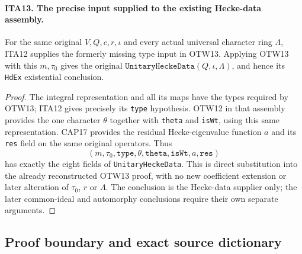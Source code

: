 \paragraph{ITA13. The precise input supplied to the existing Hecke-data assembly.}
\label{claim:ITA13}
For the same original $V,Q,c,r,\iota$ and every actual
universal character ring $\Lambda$, ITA12 supplies the
formerly missing type input in OTW13.  Applying OTW13
with this $m,\tau_0$ gives the original
$\texttt{UnitaryHeckeData}(Q,\iota,\Lambda)$, and hence
its \texttt{HdEx} existential conclusion.
\begin{proof}
The integral representation and all its maps have the
types required by OTW13; ITA12 gives precisely its
\texttt{type} hypothesis.  OTW12 in that assembly
provides the one character $\theta$ together with
\texttt{theta} and \texttt{isWt}, using this same
representation.  CAP17 provides the residual
Hecke-eigenvalue function $a$ and its \texttt{res}
field on the same original operators.  Thus
\[
        (m,\tau_0,\texttt{type},\theta,
                   \texttt{theta},\texttt{isWt},a,\texttt{res})
\]
has exactly the eight fields of
\texttt{UnitaryHeckeData}.  This is direct substitution
into the already reconstructed OTW13 proof, with no
new coefficient extension or later alteration of
$\tau_0$, $r$ or $\Lambda$.  The conclusion is the
Hecke-data supplier only; the later common-ideal
and automorphy conclusions require their own
separate arguments.
\end{proof}

\subsection{Proof boundary and exact source dictionary}

